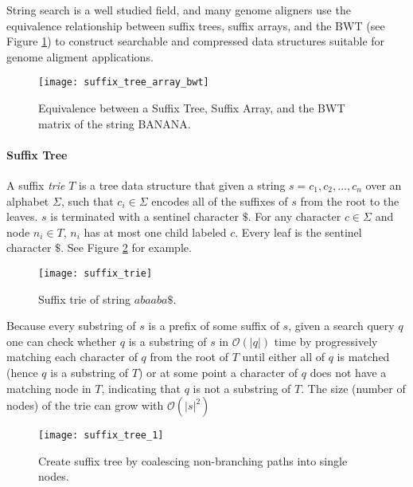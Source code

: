 String search is a well studied field, and many genome aligners use the equivalence relationship between suffix trees, suffix arrays, and the BWT (see Figure \ref{fig:suffix_tree_array_bwt}) to construct searchable and compressed data structures suitable for genome aligment applications.

\begin{figure}[H]
    \texttt{[image: suffix\_tree\_array\_bwt]}
    \centering
    \caption {Equivalence between a Suffix Tree, Suffix Array, and the BWT matrix of the string BANANA.\autocite{langmead_teaching}}
    \label{fig:suffix_tree_array_bwt}
\end{figure}

\paragraph{Suffix Tree}

A suffix \emph{trie} $T$ is a tree data structure that given a string $s=c_1,c_2,...,c_n$ over an alphabet $\Sigma$, such that $c_i \in \Sigma$ encodes all of the suffixes of $s$ from the root to the leaves. $s$ is terminated with a sentinel character $\$$. For any character $c \in \Sigma$ and node $n_i \in T$, $n_i$ has at most one child labeled $c$. Every leaf is the sentinel character $\$$. See Figure \ref{fig:suffix_trie} for example.

\begin{figure}[H]
    \texttt{[image: suffix\_trie]}
    \centering
    \caption {Suffix trie of string $abaaba\$$.\autocite{langmead_teaching}}
    \label{fig:suffix_trie}
\end{figure}

Because every substring of $s$ is a prefix of some suffix of $s$, given a search query $q$ one can check whether $q$ is a substring of $s$ in $\mathcal{O}(|q|)$ time by progressively matching each character of $q$ from the root of $T$ until either all of $q$ is matched (hence $q$ is a substring of $T$) or at some point a character of $q$ does not have a matching node in $T$, indicating that $q$ is not a substring of $T$. The size (number of nodes) of the trie can grow with $\mathcal{O}(|s|^2)$  

\begin{figure}[H]
    \texttt{[image: suffix\_tree\_1]}
    \centering
    \caption {Create suffix tree by coalescing non-branching paths into single nodes.\autocite{langmead_teaching}}
    \label{fig:suffix_tree_1}
\end{figure}

